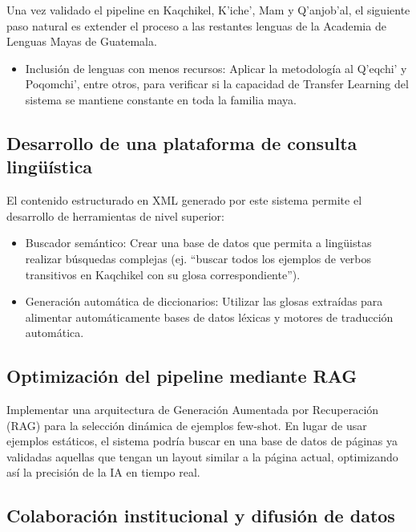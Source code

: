 Una vez validado el pipeline en Kaqchikel, K’iche’, Mam y Q’anjob’al, el siguiente paso natural es extender el proceso a las restantes lenguas de la Academia de Lenguas Mayas de Guatemala.

\begin{itemize}
    \item Inclusión de lenguas con menos recursos: Aplicar la metodología al Q’eqchi’ y Poqomchi’, entre otros, para verificar si la capacidad de Transfer Learning del sistema se mantiene constante en toda la familia maya.
\end{itemize}

\subsection{Desarrollo de una plataforma de consulta lingüística}

El contenido estructurado en XML generado por este sistema permite el desarrollo de herramientas de nivel superior:

\begin{itemize}
    \item Buscador semántico: Crear una base de datos que permita a lingüistas realizar búsquedas complejas (ej. ``buscar todos los ejemplos de verbos transitivos en Kaqchikel con su glosa correspondiente'').

    \item Generación automática de diccionarios: Utilizar las glosas extraídas para alimentar automáticamente bases de datos léxicas y motores de traducción automática.
\end{itemize}

\subsection{Optimización del pipeline mediante RAG}

Implementar una arquitectura de Generación Aumentada por Recuperación (RAG) para la selección dinámica de ejemplos few-shot. En lugar de usar ejemplos estáticos, el sistema podría buscar en una base de datos de páginas ya validadas aquellas que tengan un layout similar a la página actual, optimizando así la precisión de la IA en tiempo real.

\subsection{Colaboración institucional y difusión de datos}

